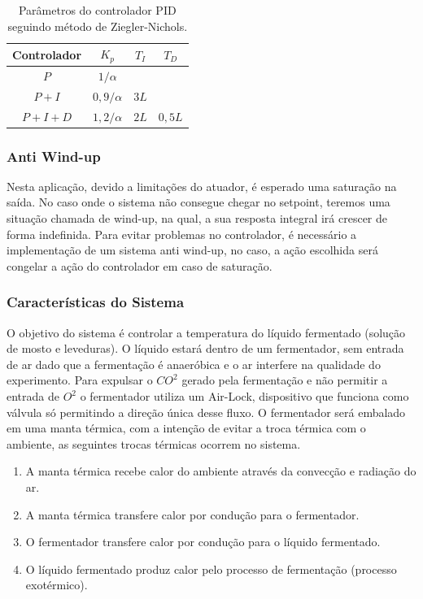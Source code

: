 \begin{table}[H]
    \begin{center}
        \begin{tabular}{ |c|c|c|c| } 
            \hline
            Controlador & \(K_p\) & \(T_I\) & \(T_D\) \\
            \hline
            \(P\) & \(1/\alpha\) &  & \\
            \hline
            \(P + I\) & \(0,9/\alpha\) & \(3L\) & \\
            \hline
            \(P + I + D\) & \(1,2/\alpha\) & \(2L\) & \(0,5L\) \\
            \hline
        \end{tabular}
        \caption{\label{tab:parametros_ziegler} Parâmetros do controlador PID seguindo método de Ziegler-Nichols.}
    \end{center}
\end{table}


\subsubsection{Anti Wind-up}

Nesta aplicação, devido a limitações do atuador, é esperado uma saturação na saída. No caso onde o sistema não consegue chegar no setpoint, teremos uma situação chamada de wind-up, na qual, a sua resposta integral irá crescer de forma indefinida. Para evitar problemas no controlador, é necessário a implementação de um sistema anti wind-up, no caso, a ação escolhida será congelar a ação do controlador em caso de saturação.  

\subsubsection{Características do Sistema}

O objetivo do sistema é controlar a temperatura do líquido fermentado (solução de mosto e leveduras). O líquido estará dentro de um fermentador, sem entrada de ar dado que a fermentação é anaeróbica e o ar interfere na qualidade do experimento. Para expulsar o $CO^2$ gerado pela fermentação e não permitir a entrada de $O^2$ o fermentador utiliza um Air-Lock, dispositivo que funciona como válvula só permitindo a direção única desse fluxo. O fermentador será embalado em uma manta térmica, com a intenção de evitar a troca térmica com o ambiente, as seguintes trocas térmicas ocorrem no sistema. 

\begin{enumerate}
    \item A manta térmica recebe calor do ambiente através da convecção e radiação do ar. 
    \item A manta térmica transfere calor por condução para o fermentador. 
    \item O fermentador transfere calor por condução para o líquido fermentado. 
    \item O líquido fermentado produz calor pelo processo de fermentação (processo exotérmico).
\end{enumerate}


